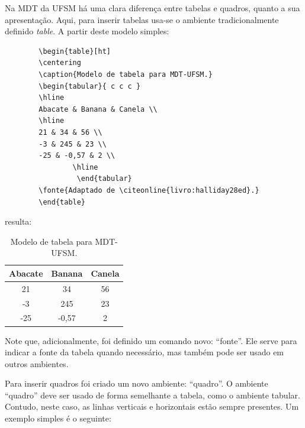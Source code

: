 \documentclass[oneside,openright,12pt]{ufsm_2021} %
\begin{document}
         \par Na MDT da UFSM há uma clara diferença entre tabelas e quadros, quanto a sua apresentação. Aqui, para inserir tabelas usa-se o ambiente tradicionalmente definido \textit{table}. A partir deste modelo simples:
        
         \begin{verbatim}
		\begin{table}[ht]
		\centering
		\caption{Modelo de tabela para MDT-UFSM.}
		\begin{tabular}{ c c c }
		\hline
		Abacate & Banana & Canela \\
		\hline
		21 & 34 & 56 \\
		-3 & 245 & 23 \\
		-25 & -0,57 & 2 \\
                \hline
                 \end{tabular}
		\fonte{Adaptado de \citeonline{livro:halliday28ed}.}
		\end{table}
	  \end{verbatim}
         
         \noindent resulta:
         
         \begin{table}[ht]
         \centering
         \caption{Modelo de tabela para MDT-UFSM.}
         \begin{tabular}{ c c c }
         \hline
         Abacate & Banana & Canela \\
         \hline
         21 & 34 & 56 \\
         -3 & 245 & 23 \\
         -25 & -0,57 & 2 \\
         \hline
         \end{tabular}
         \end{table}
         
         \par Note que, adicionalmente, foi definido um comando novo: ``fonte''. Ele serve para indicar a fonte da tabela quando necessário, mas também pode ser usado em outros ambientes.
         
         \par Para inserir quadros foi criado um novo ambiente: ``quadro''. O ambiente ``quadro'' deve ser usado de forma semelhante a tabela, como o ambiente tabular. Contudo, neste caso, as linhas verticais e horizontais estão sempre presentes. Um exemplo simples é o seguinte: 
         
\end{document}
